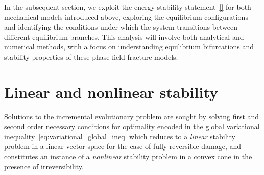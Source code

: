 

In the subsequent section, we exploit the energy-stability statement~\eqref{} for both mechanical models introduced above, exploring the equilibrium configurations and identifying the conditions under which the system transitions between different equilibrium branches. 
This analysis will involve both analytical and numerical methods, with a focus on understanding equilibrium bifurcations and stability properties of these phase-field fracture models.






% 

\section{Linear and nonlinear stability}

Solutions to the incremental evolutionary problem are sought by solving first and second order necessary conditions for optimality encoded in the global variational inequality~\eqref{eq:variational_global_ineq} which reduces to a \emph{linear} stability problem in a linear vector space for the case of fully reversible damage, and constitutes an instance of a \emph{nonlinear} stability problem in a convex cone in the presence of irreversibility.

